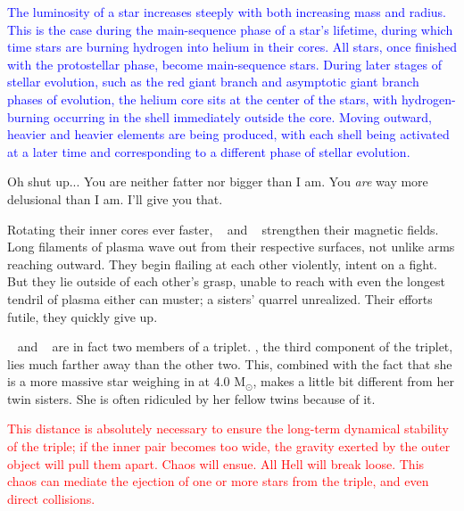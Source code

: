 \documentclass[main.tex]{subfiles}
\begin{document}
\begin{tcolorbox}[sharp corners, colback=blue!30, colframe=blue!80!blue, title=Dependence of Luminosity on Mass and Radius]
\par \textcolor{blue} {The luminosity of a star increases steeply with both increasing mass and radius.  This is the case during the main-sequence phase of a star's lifetime, during which time stars are burning hydrogen into helium in their cores.  All stars, once finished with the protostellar phase, become main-sequence stars.  During later stages of stellar evolution, such as the red giant branch and asymptotic giant branch phases of evolution, the helium core sits at the center of the stars, with hydrogen-burning occurring in the shell immediately outside the core.  Moving outward, heavier and heavier elements are being produced, with each shell being activated at a later time and corresponding to a different phase of stellar evolution.}
\end{tcolorbox}

\par \Alcyone Oh shut up...  You are neither fatter nor bigger than I am.  You \textit{are} way more delusional than I am.  I'll give you that.

\par \nar Rotating their inner cores ever faster, \rmtaygete~ and \rmalcyone~ strengthen their magnetic fields.  Long filaments of plasma wave out from their respective surfaces, not unlike arms reaching outward.  They begin flailing at each other violently, intent on a fight.  But they lie outside of each other's grasp, unable to reach with even the longest tendril of plasma either can muster; a sisters' quarrel unrealized.  Their efforts futile, they quickly give up.  

\par \nar \rmtaygete~ and \rmalcyone~ are in fact two members of a triplet.  \rmcelaeno, the third component of the triplet, lies much farther away than the other two.  This, combined with the fact that she is a more massive star weighing in at 4.0 M$_{\odot}$, makes \rmcelaeno a little bit different from her twin sisters.  She is often ridiculed by her fellow twins because of it.

\begin{tcolorbox}[sharp corners, colback=red!30, colframe=red!80!blue, title=Dynamical Stability]
\par \textcolor{red} {This distance is absolutely necessary to ensure the long-term dynamical stability of the triple;  if the inner pair becomes too wide, the gravity exerted by the outer object will pull them apart.  Chaos will ensue.  All Hell will break loose.  This chaos can mediate the ejection of one or more stars from the triple, and even direct collisions.}  
\end{tcolorbox}
\end{document}
